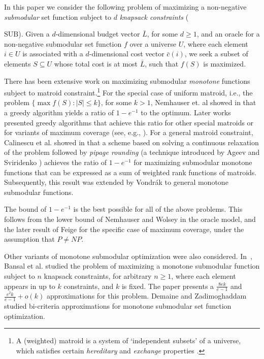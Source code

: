 \documentclass[11pt]{article}
\newcommand{\bL}{\bar{L}}
\newcommand{\bc}{\bar{c}}
\newcommand{\SUB}{\mbox{SUB}}
\begin{document}
In this paper we consider the following
problem of maximizing a non-negative {\em submodular}
set function subject to $d$
{\em knapsack constraints} ({$\SUB$). Given a $d$-dimensional
budget vector $\bL$, for some $d \geq 1$, and an oracle for a
non-negative submodular set function $f$ over a universe $U$,
where each element $i \in U$ is associated with a $d$-dimensional
cost vector $\bc(i)$, we seek a subset of elements $S \subseteq U$
whose total cost is at most $\bL$, such that $f(S)$ is maximized.

There has been extensive work on maximizing submodular {\em monotone}
functions subject to matroid constraint.\footnote{A (weighted)
matroid is a system of `independent subsets' of a universe, which
satisfies certain {\em hereditary} and {\em exchange} properties
\cite{Sch03}.} For the special case of uniform matroid,
i.e., the problem
$\{ \max f(S): |S| \leq k \}$, for some $k >1$, Nemhauser et. al
showed in \cite{NWF78}
that a greedy algorithm yields a ratio of $1-e^{-1}$ to the
optimum. Later works presented greedy algorithms that achieve this
ratio for other special matroids or for
variants of maximum coverage (see, e.g., \cite{as04,
kmn99,s04,CK04}).
For a general matroid constraint, Calinescu et al. showed in
\cite{ccpv07} that a scheme based on solving a continuous
relaxation of the problem followed by {\em pipage rounding} (a
technique introduced by Ageev and Sviridenko \cite{as04}) achieves
the ratio of $1-e^{-1}$ for maximizing submodular monotone
functions that can be expressed as a sum of weighted rank
functions of matroids. Subsequently, this result was extended by
Vondr\'{a}k \cite{Vo08} to general monotone submodular functions.

 The bound of $1 - e^{-1}$ is the best possible for all of the
above problems. This follows from the lower bound of Nemhauser and
Wolsey \cite{nw78} in the oracle model, and the later result of
Feige \cite{f98} for the specific case of maximum coverage, under
the assumption that $P \neq NP$.

Other variants of monotone submodular optimization were also considered.
In~\cite{BKNS10}, Bansal et al. studied the problem of maximizing a monotone submodular function
subject to $n$ knapsack constraints, for arbitrary $n \geq 1$, where each element appears in up to $k$
constraints, and $k$ is fixed. The paper presents a $\frac{8ek}{e-1}$ and
$\frac{e^2k}{e-1} +o(k)$ approximations for
this problem. Demaine and Zadimoghaddam \cite{DZ10} studied
bi-criteria approximations for monotone submodular set function
optimization.

}
\end{document}
